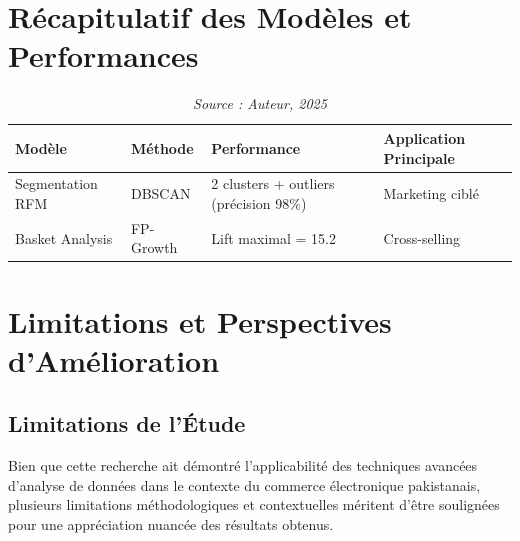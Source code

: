 \documentclass[a4paper,12pt]{article}
\begin{document}
\section{Récapitulatif des Modèles et Performances}
\begin{table}[H]
\centering
\caption{Synthèse comparative des trois modèles développés}
\caption*{\textit{Source : Auteur, 2025}}

\label{tab:model_synthesis}
\begin{tabular}{|l|p{3.5cm}|p{3.5cm}|p{3.5cm}|}
\hline
\textbf{Modèle} & \textbf{Méthode} & \textbf{Performance} & \textbf{Application Principale} \\
\hline
Segmentation RFM & DBSCAN & 2 clusters + outliers (précision 98\%) & Marketing ciblé \\
\hline

Basket Analysis & FP-Growth & Lift maximal = 15.2 & Cross-selling \\
\hline
\end{tabular}
\end{table}

\section{Limitations et Perspectives d'Amélioration}

\subsection{Limitations de l'Étude}

Bien que cette recherche ait démontré l'applicabilité des techniques avancées d'analyse de données dans le contexte du commerce électronique pakistanais, plusieurs limitations méthodologiques et contextuelles méritent d'être soulignées pour une appréciation nuancée des résultats obtenus.
\end{document}
